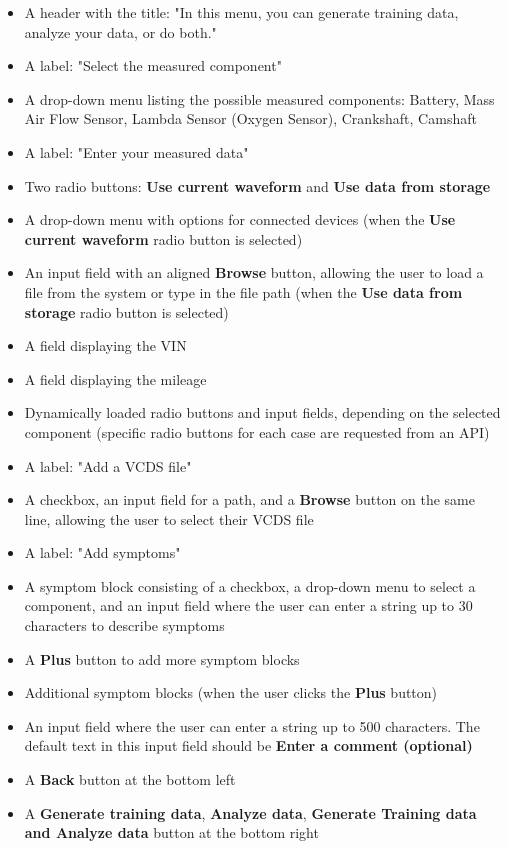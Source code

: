 \documentclass[]{scrreprt}
\begin{document}
\begin{itemize}
    \item A header with the title: "In this menu, you can generate training data, analyze your data, or do both."
    \item A label: "Select the measured component"
    \item A drop-down menu listing the possible measured components: Battery, Mass Air Flow Sensor, Lambda Sensor (Oxygen Sensor), Crankshaft, Camshaft
    \item A label: "Enter your measured data"
    \item Two radio buttons: \textbf{Use current waveform} and \textbf{Use data from storage}
    \item A drop-down menu with options for connected devices (when the \textbf{Use current waveform} radio button is selected)
    \item An input field with an aligned \textbf{Browse} button, allowing the user to load a file from the system or type in the file path (when the \textbf{Use data from storage} 
    radio button is selected)
    \item A field displaying the VIN
    \item A field displaying the mileage
    \item Dynamically loaded radio buttons and input fields, depending on the selected component (specific radio buttons for each case are requested from an API)
    \item A label: "Add a VCDS file"
    \item A checkbox, an input field for a path, and a \textbf{Browse} button on the same line, allowing the user to select their VCDS file
    \item A label: "Add symptoms"
    \item A symptom block consisting of a checkbox, a drop-down menu to select a component, and an input field where the user can enter a string up to 30 characters to describe symptoms
    \item A \textbf{Plus} button to add more symptom blocks
    \item Additional symptom blocks (when the user clicks the \textbf{Plus} button)
    \item An input field where the user can enter a string up to 500 characters. The default text in this input field should be \textbf{Enter a comment (optional)}
    \item A \textbf{Back} button at the bottom left
    \item A \textbf{Generate training data}, \textbf{Analyze data}, \textbf{Generate Training data and Analyze data} button at the bottom right
\end{itemize}
\end{document}
